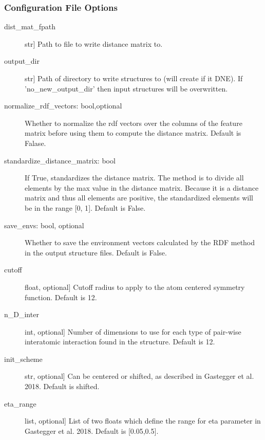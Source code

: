 \documentclass[letterpaper,10pt,english]{sphinxmanual}
\begin{document}
\begin{fulllineitems}
\begin{fulllineitems}
\begin{quote}
\begin{description}
\end{description}\end{quote}
\subsubsection*{Configuration File Options}
\begin{description}
\item[{dist\_mat\_fpath}] \leavevmode{[}str{]}
Path to file to write distance matrix to.

\item[{output\_dir}] \leavevmode{[}str{]}
Path of directory to write structures to (will create if it DNE).
If 'no\_new\_output\_dir' then input structures will be overwritten.

\item[{normalize\_rdf\_vectors: bool,optional}] \leavevmode
Whether to normalize the rdf vectors over the columns of the
feature matrix before using them to compute the distance matrix.
Default is Falase.

\item[{standardize\_distance\_matrix: bool}] \leavevmode
If True, standardizes the distance matrix. The method is to divide
all elements by the max value in the distance matrix.
Because it is a distance matrix and thus all elements are positive,
the standardized elements will be in the range {[}0, 1{]}.
Default is False.

\item[{save\_envs: bool, optional}] \leavevmode
Whether to save the environment vectors calculated by the RDF
method in the output structure files. Default is False.

\item[{cutoff}] \leavevmode{[}float, optional{]}
Cutoff radius to apply to the atom centered symmetry function.
Default is 12.

\item[{n\_D\_inter}] \leavevmode{[}int, optional{]}
Number of dimensions to use for each type of pair-wise
interatomic interaction found in the structure. Default is 12.

\item[{init\_scheme}] \leavevmode{[}str, optional{]}
Can be centered or shifted, as described in Gastegger et al. 2018.
Default is shifted.

\item[{eta\_range}] \leavevmode{[}list, optional{]}
List of two floats which define the range for eta parameter in
Gastegger et al. 2018. Default is {[}0.05,0.5{]}.


\end{description}
\end{fulllineitems}
\end{fulllineitems}
\end{document}
